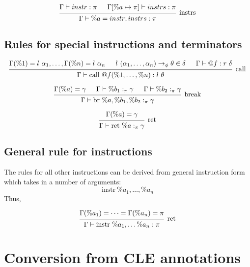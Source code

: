 \documentclass{article}
\begin{document}
\[
\begin{prooftree} 
    \hypo{\Gamma \vdash instr : \pi}
    \hypo{\Gamma[\%a \mapsto \pi] \vdash instrs : \pi}
    \infer2[instrs]{\Gamma \vdash \%a = instr; instrs : \pi}
\end{prooftree} 
\]

\subsection{Rules for special instructions and terminators}

\[
\begin{prooftree}
    \hypo{\Gamma(\%1) = l\ \alpha_1, \dots, \Gamma(\%n) = l\ \alpha_n}
    \hypo{l\ (\alpha_1, \dots, \alpha_n) \rightarrow_\phi \theta \in \delta}
    \hypo{\Gamma \vdash @f : r\ \delta}
    \infer3[call]{\Gamma \vdash \text{call } @f(\%1, \dots, \%n) : l\ \theta}
\end{prooftree}
\]

\[
\begin{prooftree}
    \hypo{\Gamma(\%a) = \gamma}
    \hypo{\Gamma \vdash \%b_1 :_\pi \gamma} 
    \hypo{\Gamma \vdash \%b_2 :_\pi \gamma} 
    \infer3[break]{\Gamma \vdash \text{br }\%a, \%b_1, \%b_2 :_\pi \gamma}
\end{prooftree}
\]

\[
\begin{prooftree}
    \hypo{\Gamma(\%a) = \gamma}
    \infer1[ret]{\Gamma \vdash \text{ret }\%a :_\pi \gamma}
\end{prooftree}
\]

\subsection{General rule for instructions}

The rules for all other instructions
can be derived from general instruction form which takes in
a number of arguments:
$$\text{instr}\ \%a_1, \dots, \%a_n$$
Thus,

\[
\begin{prooftree}
    \hypo{\Gamma(\%a_1) = \dots = \Gamma(\%a_n) = \pi}
    \infer1[ret]{\Gamma \vdash \text{instr}\ \%a_1, \dots \%a_n : \pi}
\end{prooftree}
\]


\section{Conversion from CLE annotations}
\end{document}
